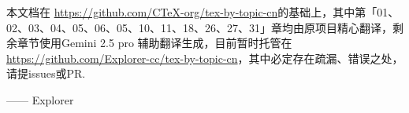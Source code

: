 \documentclass[openany]{book}
\begin{document}


\pagestyle{special}




\vspace*{10pt}


\vspace*{10pt}

本文档在 \url{https://github.com/CTeX-org/tex-by-topic-cn}的基础上，其中第「01、02、03、04、05、06、05、10、11、18、26、27、31」章均由原项目精心翻译，剩余章节使用Gemini 2.5 pro 辅助翻译生成，目前暂时托管在 \url{https://github.com/Explorer-cc/tex-by-topic-cn}，其中必定存在疏漏、错误之处，请提issues或PR.

\begin{flushright}
—— Explorer
\end{flushright}

\clearpage

\pagestyle{main}







































\pagestyle{special}


% 
\end{document}
